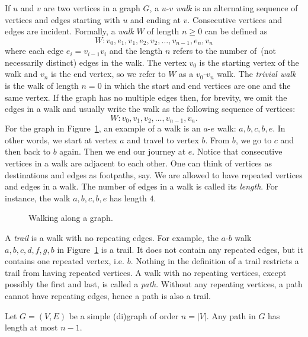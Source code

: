 If $u$ and $v$ are two vertices in a graph $G$, a $u$-$v$
\emph{walk} is an alternating sequence of vertices and
edges starting with $u$ and ending at $v$. Consecutive vertices and
edges are incident. Formally, a \emph{walk} $W$ of length
$n \geq 0$ can be defined as
\[
W: v_0, e_1, v_1, e_2, v_2, \dots, v_{n-1}, e_n, v_n
\]
where each edge $e_i = v_{i-1} v_i$ and the length
$n$ refers to the number of~(not necessarily distinct) edges in the
walk. The vertex $v_0$ is the starting vertex of the walk and $v_n$ is
the end vertex, so we refer to $W$ as a $v_0$-$v_n$ walk. The
\emph{trivial walk} is the walk of length $n = 0$ in which the start
and end vertices are one and the same vertex. If the graph has no
multiple edges then, for brevity, we omit the edges in a walk and
usually write the walk as the following sequence of vertices:
\[
W: v_0, v_1, v_2, \dots, v_{n-1}, v_n.
\]
For the graph in Figure~\ref{fig:introduction:types_of_walks}, an
example of a walk is an $a$-$e$ walk: $a, b, c, b, e$. In other words,
we start at vertex $a$ and travel to vertex $b$. From $b$, we go to
$c$ and then back to $b$ again. Then we end our journey at $e$. Notice
that consecutive vertices in a walk are adjacent to each other. One
can think of vertices as destinations and edges as footpaths, say. We
are allowed to have repeated vertices and edges in a walk. The number
of edges in a walk is called its \emph{length}. For
instance, the walk $a, b, c, b, e$ has length $4$.

\begin{figure}[!htbp]
\centering

\caption{Walking along a graph.}
\label{fig:introduction:types_of_walks}
\end{figure}

A \emph{trail} is a walk with no repeating edges. For
example, the $a$-$b$ walk $a, b, c, d, f, g, b$ in
Figure~\ref{fig:introduction:types_of_walks} is a trail. It does not
contain any repeated edges, but it contains one repeated vertex,
i.e. $b$. Nothing in the definition of a trail restricts a trail from
having repeated vertices. A walk with no repeating vertices, except
possibly the first and last, is called a \emph{path}.
Without any repeating vertices, a path cannot have repeating edges,
hence a path is also a trail.

\begin{proposition}
\label{prop:introduction:any_path_has_length_at_most_n_minus_1}
Let $G = (V, E)$ be a simple (di)graph of order $n = |V|$. Any path in $G$
has length at most $n - 1$.
\end{proposition}

